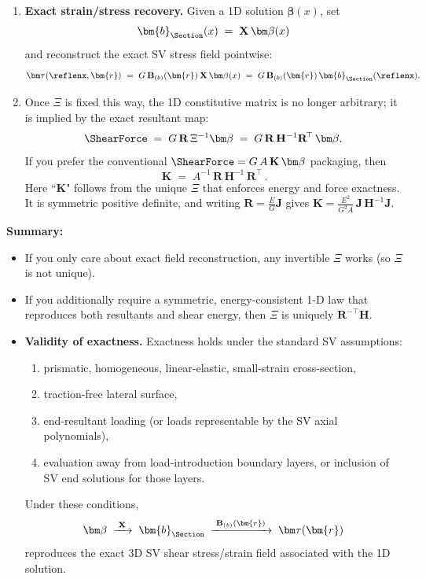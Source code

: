 \begin{enumerate}
  \item \textbf{Exact strain/stress recovery.}
  Given a 1D solution \(\bm\beta(x)\), set
  \[
  \bm{b}_{\Section}(x) \;=\; \mathbf{X}\,\bm\beta(x)
  \]
  and reconstruct the exact SV stress field pointwise:
  \[
  \bm\tau(\reflenx,\bm{r}) \;=\; G\,\mathbf{B}_{(b)}(\bm{r})\,\mathbf{X}\,\bm\beta(x) \;=\; G\,\mathbf{B}_{(b)}(\bm{r})\,\bm{b}_{\Section}(\reflenx).
  \]

\item Once \(\Xi\) is fixed this way, the 1D constitutive matrix is no longer arbitrary; it is implied by the exact resultant map:
\[
\ShearForce \;=\; G\,\mathbf R\,\Xi^{-1}\bm\beta
\;=\; G\,\mathbf R\,\mathbf H^{-1}\mathbf R^{\!\top}\,\bm\beta.
\]
If you prefer the conventional \( \ShearForce = G\,A\,\mathbf K\,\bm\beta \) packaging, then
\[
\boxed{\, \mathbf K \;=\; A^{-1}\,\mathbf R\,\mathbf H^{-1}\,\mathbf R^{\!\top} \, }.
\]
Here ``\(\mathbf K\)" follows from the unique \(\Xi\) that enforces energy and force exactness. It is symmetric positive definite, and writing \( \mathbf R = \tfrac{E}{G}\mathbf{J} \) gives \( \mathbf K = \tfrac{E^2}{G^2A}\,\mathbf{J}\,\mathbf H^{-1}\mathbf{J} \).
\end{enumerate}
\textbf{Summary:}
\begin{itemize}
\item If you only care about exact field reconstruction, any invertible \(\Xi\) works (so \(\Xi\) is not unique).
\item If you additionally require a symmetric, energy-consistent 1-D law that reproduces both resultants and shear energy, then \(\Xi\) is uniquely \( \mathbf R^{-\!\top}\mathbf H\).

\item \textbf{Validity of exactness.}
  Exactness holds under the standard SV assumptions:
  \begin{enumerate}
    \item prismatic, homogeneous, linear-elastic, small-strain cross-section,
    \item traction-free lateral surface,
    \item end-resultant loading (or loads representable by the SV axial polynomials),
    \item evaluation away from load-introduction boundary layers, or inclusion of SV end solutions for those layers.
  \end{enumerate}
  Under these conditions,
  \[
  \bm\beta \;\xrightarrow{\;\mathbf{X}\;}\; \bm{b}_{\Section} \;\xrightarrow{\;\mathbf{B}_{(b)}(\bm{r})\;}\; \bm\tau(\bm{r})
  \]
  reproduces the exact 3D SV shear stress/strain field associated with the 1D solution.
\end{itemize}
